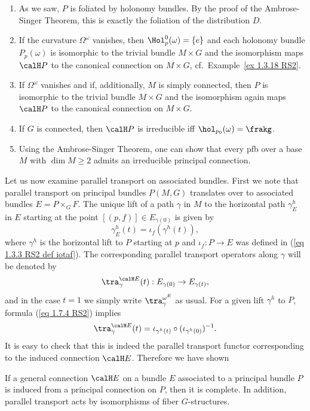\begin{rem}
    \begin{enumerate}
        \item As we saw, $P$ is foliated by holonomy bundles. By the proof of the Ambrose-Singer Theorem, this is exactly the foliation of the distribution $D$.

        \item If the curvature $\Omega^\omega$ vanishes, then $\Hol_p^0(\omega)=\{e\}$ and each holonomy bundle $P_p(\omega)$ is isomorphic to the trivial bundle $M\times G$ and the isomorphism maps $\calH P$ to the canonical connection on $M\times G$, cf.\ Example~\ref{ex 1.3.18 RS2}.

        \item If $\Omega^\omega$ vanishes and if, additionally, $M$ is simply connected, then $P$ is isomorphic to the trivial bundle $M\times G$ and the isomorphism again maps $\calH P$ to the canonical connection on $M\times G$.
        
        \item If $G$ is connected, then $\calH P$ is irreducible iff $\hol_{p_0}(\omega)=\frakg$.

        \item Using the Ambrose-Singer Theorem, one can show that every \gls{pfb} over a base $M$ with $\dim M\geq 2$ admits an irreducible principal connection.
    \end{enumerate}
\end{rem}



Let us now examine parallel transport on associated bundles. First we note that parallel transport on principal bundles $P(M,G)$ translates over to associated bundles $E=P\times_G F$. The unique lift of a path $\gamma$ in $M$ to the horizontal path $\gamma_E^h$ in $E$ starting at the point $[(p,f)]\in E_{\gamma(0)}$ is  given by
\[\gamma^h_E(t)=\iota_f(\gamma^h(t)),\label{eq 1.7.7 RS2}\]
where $\gamma^h$ is the horizontal lift to $P$ starting at $p$ and $\iota_f:P\to E$ was defined in (\ref{eq 1.3.3 RS2 def iotaf}). The corresponding parallel transport operators along $\gamma$ will be denoted by
\[\tra_\gamma^{\calH E}(t):E_{\gamma(0)}\to E_{\gamma(t)},\]
and in the case $t=1$ we simply write $\tra_\gamma^{\omega^E}$ as usual. For a given lift $\gamma^h$ to $P$, formula (\ref{eq 1.7.4 RS2}) implies 
\[\tra_\gamma^{\calH E}(t)=\iota_{\gamma^h(t)}\circ (\iota_{\gamma^h(0)})^{-1}.\label{eq 1.7.8 RS2}\]
It is easy to check that this is indeed the parallel transport functor corresponding to the induced connection $\calH E$. Therefore we have shown
\begin{cor}
    If a general connection $\calH E$ on a bundle $E$ associated to a principal bundle $P$ is induced from a principal connection on $P$, then it is complete. In addition, parallel transport acts by isomorphisms of fiber $G$-structures.
\end{cor}

